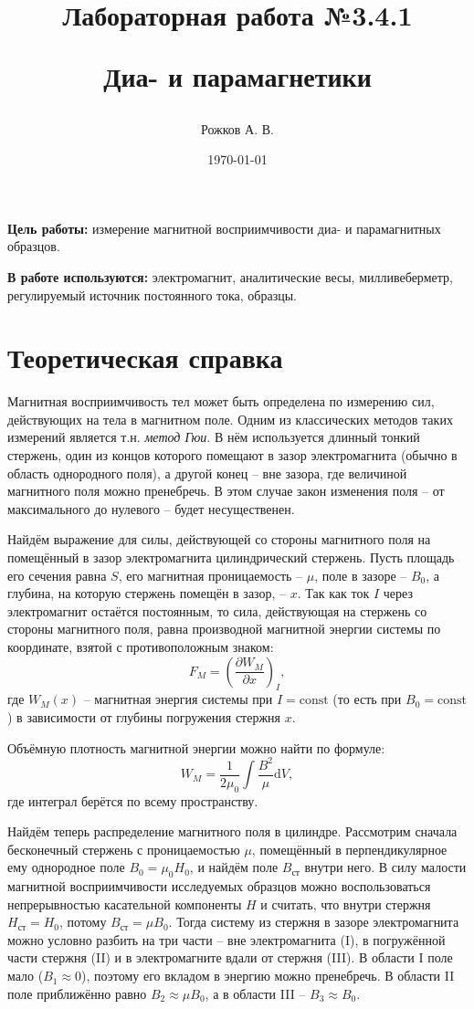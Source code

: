 \documentclass[a4paper, 12pt]{article}
\title{\begin{center}Лабораторная работа №3.4.1\end{center}
Диа- и парамагнетики}
\author{Рожков А. В.}
\date{\today}
\begin{document}
    \maketitle
    \newpage

    \textbf{Цель работы:} измерение магнитной восприимчивости диа- и парамагнитных образцов.

    \textbf{В работе используются:} электромагнит, аналитические весы, милливеберметр, регулируемый источник постоянного тока, образцы.

    \section*{Теоретическая справка}

    Магнитная восприимчивость тел может быть определена по измерению сил, действующих на тела в магнитном поле. Одним из классических методов таких измерений является т.н. \textit{метод Гюи}. В нём используется длинный тонкий стержень, один из концов которого помещают в зазор электромагнита (обычно в область однородного поля), а другой конец -- вне зазора, где величиной магнитного поля можно пренебречь. В этом случае закон изменения поля -- от максимального до нулевого -- будет несущественен.

    Найдём выражение для силы, действующей со стороны магнитного поля на помещённый в зазор электромагнита цилиндрический стержень. Пусть площадь его сечения равна $S$, его магнитная проницаемость -- $\mu$, поле в зазоре -- $B_0$, а глубина, на которую стержень помещён в зазор, -- $x$. Так как ток $I$ через электромагнит остаётся постоянным, то сила, действующая на стержень со стороны магнитного поля, равна производной магнитной энергии системы по координате, взятой с противоположным знаком:\[F_M=\left(\frac{\partial W_M}{\partial x}\right)_I,\]где $W_M(x)$ -- магнитная энергия системы при $I=\text{const}$ (то есть при $B_0=\text{const}$) в зависимости от глубины погружения стержня $x$.

    Объёмную плотность магнитной энергии можно найти по формуле:\[W_M=\frac{1}{2\mu_0}\int\frac{B^2}{\mu}\text{d}V,\]где интеграл берётся по всему пространству.

    Найдём теперь распределение магнитного поля в цилиндре. Рассмотрим сначала бесконечный стержень с проницаемостью $\mu$, помещённый в перпендикулярное ему однородное поле $B_0=\mu_0H_0$, и найдём поле $B_{\text{ст}}$ внутри него. В силу малости магнитной восприимчивости исследуемых образцов можно воспользоваться непрерывностью касательной компоненты $H$ и считать, что внутри стержня $H_{\text{ст}}=H_0$, потому $B_{\text{ст}}=\mu B_0$. Тогда систему из стержня в зазоре электромагнита можно условно разбить на три части -- вне электромагнита (I), в погружённой части стержня (II) и в электромагните вдали от стержня (III). В области I поле мало ($B_1\approx0$), поэтому его вкладом в энергию можно пренебречь. В области II поле приближённо равно $B_2\approx\mu B_0$, а в области III -- $B_3\approx B_0$.
\end{document}
